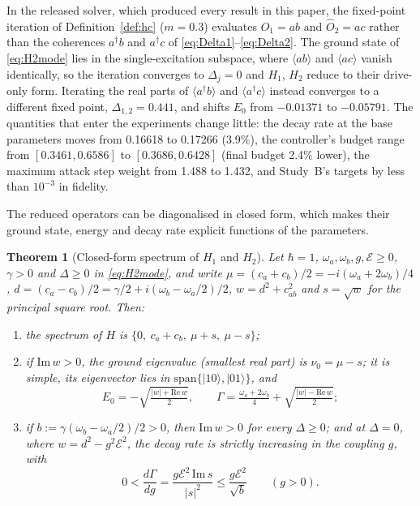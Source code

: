 \documentclass[conference]{IEEEtran}
\newtheorem{theorem}{Theorem}
\newcommand{\cE}{\mathcal{E}}
\begin{document}
In the released solver, which produced every result in this paper, the fixed-point iteration of Definition~\ref{def:hc} ($m=0.3$) evaluates $\hat O_1=ab$ and $\hat O_2=ac$ rather than the coherences $a^\dagger b$ and $a^\dagger c$ of \eqref{eq:Delta1}--\eqref{eq:Delta2}. The ground state of \eqref{eq:H2mode} lies in the single-excitation subspace, where $\langle ab\rangle$ and $\langle ac\rangle$ vanish identically, so the iteration converges to $\Delta_j=0$ and $H_1$, $H_2$ reduce to their drive-only form. Iterating the real parts of $\langle a^\dagger b\rangle$ and $\langle a^\dagger c\rangle$ instead converges to a different fixed point, $\Delta_{1,2}=0.441$, and shifts $E_0$ from $-0.01371$ to $-0.05791$. The quantities that enter the experiments change little: the decay rate at the base parameters moves from 0.16618 to 0.17266 (3.9\%), the controller's budget range from $[0.3461,0.6586]$ to $[0.3686,0.6428]$ (final budget 2.4\% lower), the maximum attack step weight from 1.488 to 1.432, and Study~B's targets by less than $10^{-3}$ in fidelity.

The reduced operators can be diagonalised in closed form, which makes their ground state, energy and decay rate explicit functions of the parameters.

\begin{theorem}[Closed-form spectrum of $H_1$ and $H_2$]\label{thm:spec}
Let $\hbar=1$, $\omega_a,\omega_b,g,\cE\ge0$, $\gamma>0$ and $\Delta\ge0$ in \eqref{eq:H2mode}, and write $\mu=(c_a+c_b)/2=-i(\omega_a+2\omega_b)/4$, $d=(c_a-c_b)/2=\gamma/2+i(\omega_b-\omega_a/2)/2$, $w=d^2+c_{ab}^2$ and $s=\sqrt w$ for the principal square root. Then:
\begin{enumerate}
\item[(i)] the spectrum of $H$ is $\{0,\ c_a+c_b,\ \mu+s,\ \mu-s\}$;
\item[(ii)] if $\mathrm{Im}\,w>0$, the ground eigenvalue (smallest real part) is $\nu_0=\mu-s$; it is simple, its eigenvector lies in $\mathrm{span}\{|10\rangle,|01\rangle\}$, and
\begin{equation}
E_0=-\sqrt{\tfrac{|w|+\mathrm{Re}\,w}{2}},\qquad \Gamma=\tfrac{\omega_a+2\omega_b}{4}+\sqrt{\tfrac{|w|-\mathrm{Re}\,w}{2}};
\label{eq:gammaclosed}
\end{equation}
\item[(iii)] if $b:=\gamma(\omega_b-\omega_a/2)/2>0$, then $\mathrm{Im}\,w>0$ for every $\Delta\ge0$; and at $\Delta=0$, where $w=d^2-g^2\cE^2$, the decay rate is strictly increasing in the coupling $g$, with
\begin{equation}
0<\frac{d\Gamma}{dg}=\frac{g\cE^2\,\mathrm{Im}\,s}{|s|^2}\le\frac{g\cE^2}{\sqrt b}\qquad(g>0).
\label{eq:dgamma}
\end{equation}
\end{enumerate}
\end{theorem}
\end{document}
